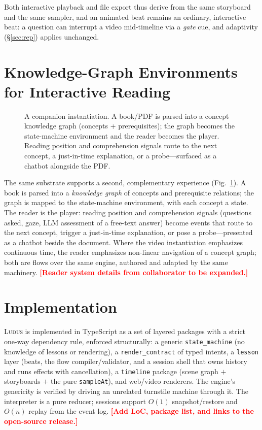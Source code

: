 \documentclass[sigconf,review,anonymous]{acmart}
\newcommand{\PH}[1]{\textcolor{red}{\textbf{[#1]}}}
\newcommand{\sys}{\textsc{Ludus}\xspace}
\begin{document}
Both interactive playback and file export thus derive from the same storyboard
and the same sampler, and an animated beat remains an ordinary, interactive
beat: a question can interrupt a video mid-timeline via a \emph{gate} cue, and
adaptivity (\S\ref{sec:rep}) applies unchanged.

\section{Knowledge-Graph Environments for Interactive Reading}
\label{sec:kg}

\begin{figure}[t]
  \centering
  \resizebox{\columnwidth}{!}{}
  \caption{A companion instantiation. A book/PDF is parsed into a concept
  knowledge graph (concepts + prerequisites); the graph becomes the
  state-machine environment and the reader becomes the player. Reading position
  and comprehension signals route to the next concept, a just-in-time
  explanation, or a probe---surfaced as a chatbot alongside the PDF.}
  \label{fig:kg}
\end{figure}

The same substrate supports a second, complementary experience
(Fig.~\ref{fig:kg}). A book is parsed into a \emph{knowledge graph} of concepts
and prerequisite relations; the graph is mapped to the state-machine
environment, with each concept a state. The reader is the player: reading
position and comprehension signals (questions asked, gaze, LLM assessment of a
free-text answer) become events that route to the next concept, trigger a
just-in-time explanation, or pose a probe---presented as a chatbot beside the
document. Where the video instantiation emphasizes continuous time, the reader
emphasizes non-linear navigation of a concept graph; both are flows over the
same engine, authored and adapted by the same machinery. \PH{Reader system
details from collaborator to be expanded.}

\section{Implementation}
\label{sec:impl}

\sys{} is implemented in TypeScript as a set of layered packages with a strict
one-way dependency rule, enforced structurally: a generic \texttt{state\_machine}
(no knowledge of lessons or rendering), a \texttt{render\_contract} of typed
intents, a \texttt{lesson} layer (beats, the flow compiler/validator, and a
session shell that owns history and runs effects with cancellation), a
\texttt{timeline} package (scene graph $+$ storyboards $+$ the pure
\texttt{sampleAt}), and web/video renderers. The engine's genericity is verified
by driving an unrelated turnstile machine through it. The interpreter is a pure
reducer; sessions support $O(1)$ snapshot/restore and $O(n)$ replay from the
event log. \PH{Add LoC, package list, and links to the open-source release.}
\end{document}
